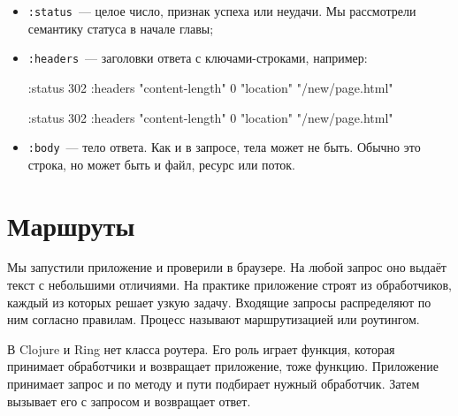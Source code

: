 \begin{itemize}

\item
  \verb|:status|~--- целое число, признак успеха или неудачи. Мы рассмотрели
  семантику статуса в начале главы;

\item
  \verb|:headers|~--- заголовки ответа с клю\-ча\-ми-стр\-ок\-ами, например:


\ifnarrow

\begin{english}
  \begin{clojure}
{:status 302
 :headers
   {"content-length" 0
    "location" "/new/page.html"}}
  \end{clojure}
\end{english}

\else

\begin{english}
  \begin{clojure}
{:status 302
 :headers {"content-length" 0
           "location" "/new/page.html"}}
  \end{clojure}
\end{english}

\fi

\item
  \verb|:body|~--- тело ответа. Как и в запросе, тела может не быть. Обычно
  это строка, но может быть и файл, ресурс или поток.

\end{itemize}

\section{Маршруты}


Мы запустили приложение и проверили в браузере. На любой запрос оно выдаёт текст
с небольшими отличиями. На практике приложение строят из обработчиков, каждый из
которых решает узкую задачу. Входящие запросы распределяют по ним согласно
правилам. Процесс называют маршрутизацией или роутингом.

В Clojure и Ring нет класса роутера. Его роль играет функция, которая принимает
обработчики и возвращает приложение, тоже функцию. Приложение принимает запрос и
по методу и пути подбирает нужный обработчик. Затем вызывает его с запросом и
возвращает ответ.


